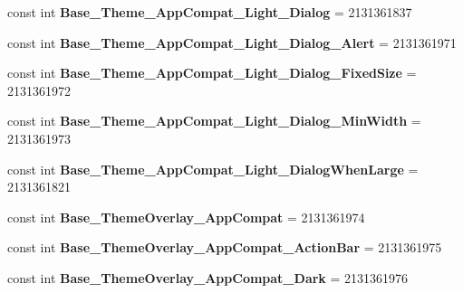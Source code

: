 \begin{DoxyCompactItemize}
const int {\bfseries Base\+\_\+\+Theme\+\_\+\+App\+Compat\+\_\+\+Light\+\_\+\+Dialog} = 2131361837
\item 
\mbox{\label{class_sample_app_1_1_droid_1_1_resource_1_1_style_a5a55a11664dc78a0859ef93cc51cea3c}} 
const int {\bfseries Base\+\_\+\+Theme\+\_\+\+App\+Compat\+\_\+\+Light\+\_\+\+Dialog\+\_\+\+Alert} = 2131361971
\item 
\mbox{\label{class_sample_app_1_1_droid_1_1_resource_1_1_style_a45931cb044ff0acda59d8885d065ee1c}} 
const int {\bfseries Base\+\_\+\+Theme\+\_\+\+App\+Compat\+\_\+\+Light\+\_\+\+Dialog\+\_\+\+Fixed\+Size} = 2131361972
\item 
\mbox{\label{class_sample_app_1_1_droid_1_1_resource_1_1_style_a798eb10b66c690db83cf225bf96d8f4b}} 
const int {\bfseries Base\+\_\+\+Theme\+\_\+\+App\+Compat\+\_\+\+Light\+\_\+\+Dialog\+\_\+\+Min\+Width} = 2131361973
\item 
\mbox{\label{class_sample_app_1_1_droid_1_1_resource_1_1_style_a7bcaa310e464a5b90061d89f0c32b8e7}} 
const int {\bfseries Base\+\_\+\+Theme\+\_\+\+App\+Compat\+\_\+\+Light\+\_\+\+Dialog\+When\+Large} = 2131361821
\item 
\mbox{\label{class_sample_app_1_1_droid_1_1_resource_1_1_style_a3f6ea526bb86e5cd09e2c8a1fd0267f6}} 
const int {\bfseries Base\+\_\+\+Theme\+Overlay\+\_\+\+App\+Compat} = 2131361974
\item 
\mbox{\label{class_sample_app_1_1_droid_1_1_resource_1_1_style_a34adaf7398e5a90b1614cf836c7aa10e}} 
const int {\bfseries Base\+\_\+\+Theme\+Overlay\+\_\+\+App\+Compat\+\_\+\+Action\+Bar} = 2131361975
\item 
\mbox{\label{class_sample_app_1_1_droid_1_1_resource_1_1_style_aeee31666294d87bd0aa09dbc5c9cfde1}} 
const int {\bfseries Base\+\_\+\+Theme\+Overlay\+\_\+\+App\+Compat\+\_\+\+Dark} = 2131361976
\item 
\mbox{\label{class_sample_app_1_1_droid_1_1_resource_1_1_style_a613476a658cf227d4de0cb18692b798e}} 

\end{DoxyCompactItemize}
